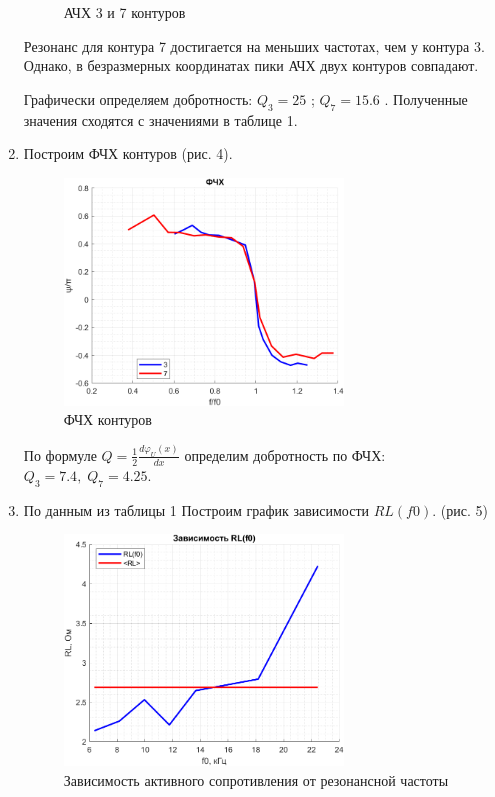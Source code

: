 \documentclass[a4paper,12pt]{article}
\begin{document}
\begin{enumerate}
\begin{figure}[h]
\begin{minipage}[h]{0.49\textwidth}
\end{minipage}
\caption{АЧХ 3 и 7 контуров}
\end{figure}

Резонанс для контура 7 достигается на меньших частотах, чем у контура 3. Однако, в безразмерных координатах пики АЧХ двух контуров совпадают.

Графически определяем добротность: $Q_3=25$ ; $Q_7=15.6$ . Полученные значения сходятся с значениями в таблице 1.

\item Построим ФЧХ контуров (рис. 4).

\begin{figure}[h]
\centering
\includegraphics[width=0.7\textwidth]{pfc.png}
\caption{ФЧХ контуров}
\end{figure}

По формуле $Q = \frac{1}{2} \frac{d\varphi_U(x)}{dx}$ определим добротность по ФЧХ: $Q_3 = 7.4, \; Q_7 = 4.25$.

\item По данным из таблицы 1 Построим график зависимости $RL (f0)$. (рис. 5)

\begin{figure}[h]
\centering
\includegraphics[width=0.7\textwidth]{rl.png}
\caption{Зависимость активного сопротивления от резонансной частоты}
\end{figure}

\FloatBarrier

\end{enumerate}
\end{document}
